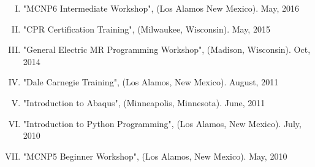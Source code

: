 \normalsize
{}
\begin{enumerate}[I.]%
	\item "MCNP6 Intermediate Workshop", (Los Alamos New Mexico). May, 2016 \vspace{3mm}
	\item "CPR Certification Training", (Milwaukee, Wisconsin). May, 2015 \vspace{3mm}
	\item "General Electric MR Programming Workshop", (Madison, Wisconsin). Oct, 2014 \vspace{3mm}
	\item "Dale Carnegie Training", (Los Alamos, New Mexico). August, 2011 \vspace{3mm}
	\item "Introduction to Abaqus", (Minneapolis, Minnesota). June, 2011 \vspace{3mm}
	\item "Introduction to Python Programming", (Los Alamos, New Mexico). July, 2010 \vspace{3mm}
	\item "MCNP5 Beginner Workshop", (Los Alamos, New Mexico). May, 2010 \vspace{3mm}
\end{enumerate}
